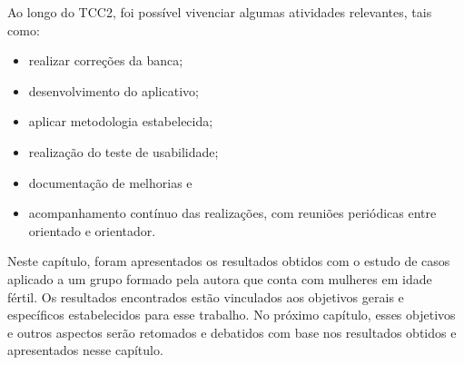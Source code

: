 Ao longo do TCC2, foi possível vivenciar algumas atividades relevantes, tais como:

\begin{itemize}
    \item realizar correções da banca;
    \item desenvolvimento do aplicativo;
    \item aplicar metodologia estabelecida;
    \item realização do teste de usabilidade;
    \item documentação de melhorias e
    \item acompanhamento contínuo das realizações, com reuniões periódicas entre orientado e orientador.
\end{itemize}

Neste capítulo, foram apresentados os resultados obtidos com o estudo de casos aplicado a um grupo formado pela autora que conta com 
mulheres em idade fértil. Os resultados encontrados
estão vinculados aos objetivos gerais e específicos estabelecidos para esse trabalho. No próximo capítulo,
esses objetivos e outros aspectos serão retomados e debatidos com base nos resultados
obtidos e apresentados nesse capítulo.